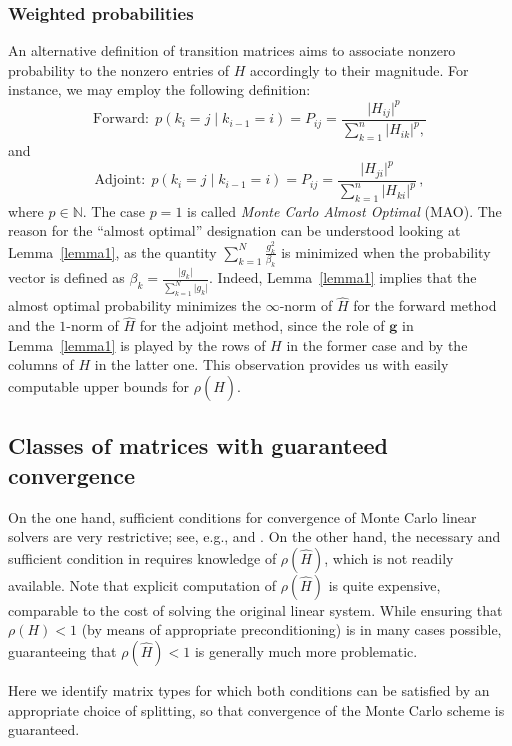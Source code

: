 \documentclass[times]{nlaauth}
\begin{document}
\subsubsection{Weighted probabilities}

An alternative definition of transition matrices aims to associate nonzero
probability to the nonzero entries of $H$ accordingly to their magnitude. For
instance, we may employ the following definition:
\[
\text{Forward}: \;
p(k_i=j \;\lvert\;k_{i-1}=i )=P_{ij}=\frac{\lvert
H_{ij}\rvert^p}{\sum_{k=1}^n
\lvert H_{ik}\rvert^p,}
\]
and
\[
\text{Adjoint}: \;
p(k_i=j \;\lvert\;k_{i-1}=i )=P_{ij}=\frac{\lvert
H_{ji}\rvert^p}{\sum_{k=1}^n
\lvert H_{ki}\rvert^p} \,,
\]
where $p\in \mathbb{N}$.
The case $p=1$ is called
\textit{Monte Carlo Almost Optimal} (MAO).
The reason for the ``almost optimal'' designation can be understood looking
at
Lemma~\ref{lemma1}, as the quantity
$\sum_{k=1}^N\frac{g_k^2}{\beta_k}$
is minimized when the probability vector is
defined as $\displaystyle \beta_k=\frac{\lvert
g_k\rvert}{\sum_{k=1}^N \lvert
g_k\rvert}$. Indeed, Lemma~\ref{lemma1} implies that the almost optimal probability
minimizes the
$\infty$-norm of $\hat{H}$ for the forward method and the $1$-norm of $\hat{H}$
for the adjoint method, since the role of $\mathbf{g}$ in Lemma~\ref{lemma1} is played
by the rows of $H$ in the former case and by the columns of $H$ in the latter one.
This observation provides us with easily computable upper bounds for
$\rho(\hat{H})$.

\subsection{Classes of matrices with guaranteed convergence}

On the one hand, sufficient conditions for
convergence of Monte Carlo linear solvers are very restrictive; see, e.g.,
\cite{Srin2010} and \cite{MASC2013}. On the other hand, the necessary and
sufficient
condition in \cite{MASC2013} requires knowledge of $\rho(\hat{H})$, which
is not readily available. Note that explicit computation of $\rho(\hat{H})$
is quite expensive, comparable to the cost of solving the original linear system.
While ensuring that $\rho(H)<1$ (by means of appropriate preconditioning)
is in many cases possible, guaranteeing that $\rho(\hat{H})<1$ is generally
much more problematic.

Here we identify matrix types for which both conditions can be satisfied
by an appropriate choice of splitting, so that convergence of the Monte Carlo scheme
is guaranteed.
\end{document}
